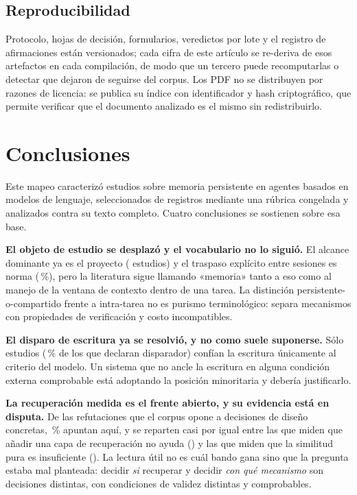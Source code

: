 \documentclass[conference]{IEEEtran}
\begin{document}
\subsection{Reproducibilidad}

Protocolo, hojas de decisión, formularios, veredictos por lote y el registro de afirmaciones están
versionados; cada cifra de este artículo se re-deriva de esos artefactos en cada compilación, de modo
que un tercero puede recomputarlas o detectar que dejaron de seguirse del corpus. Los PDF no se
distribuyen por razones de licencia: se publica su índice con identificador y hash criptográfico, que
permite verificar que el documento analizado es el mismo sin redistribuirlo.

\section{Conclusiones}
\label{sec:conclusions}

Este mapeo caracterizó \clCarAnalizados{} estudios sobre memoria persistente en agentes basados en
modelos de lenguaje, seleccionados de \clSelUnicos{} registros mediante una rúbrica congelada y
analizados contra su texto completo. Cuatro conclusiones se sostienen sobre esa base.

\textbf{El objeto de estudio se desplazó y el vocabulario no lo siguió.} El alcance dominante ya es
el proyecto (\clRQcuatroProyecto{} estudios) y el traspaso explícito entre sesiones es norma
(\clRQcuatroHandoffPct{}\,\%), pero la literatura sigue llamando «memoria» tanto a eso como al manejo
de la ventana de contexto dentro de una tarea. La distinción persistente-o-compartido frente a
intra-tarea no es purismo terminológico: separa mecanismos con propiedades de verificación y costo
incompatibles.

\textbf{El disparo de escritura ya se resolvió, y no como suele suponerse.} Sólo
\clRQdosSoloDiscrecional{} estudios (\clRQdosSoloDiscrecionalPct{}\,\% de los que declaran
disparador) confían la escritura únicamente al criterio del modelo. Un sistema que no ancle la
escritura en alguna condición externa comprobable está adoptando la posición minoritaria y debería
justificarlo.

\textbf{La recuperación medida es el frente abierto, y su evidencia está en disputa.} De las
\clMFrefuta{} refutaciones que el corpus opone a decisiones de diseño concretas,
\clMFrefutaGMdosPct{}\,\% apuntan aquí, y se reparten casi por igual entre las que miden que añadir
una capa de recuperación no ayuda (\clGMdosMenos{}) y las que miden que la similitud pura es
insuficiente (\clGMdosMas{}). La lectura útil no es cuál bando gana sino que la pregunta estaba mal
planteada: decidir \emph{si} recuperar y decidir \emph{con qué mecanismo} son decisiones distintas,
con condiciones de validez distintas y comprobables.
\end{document}
